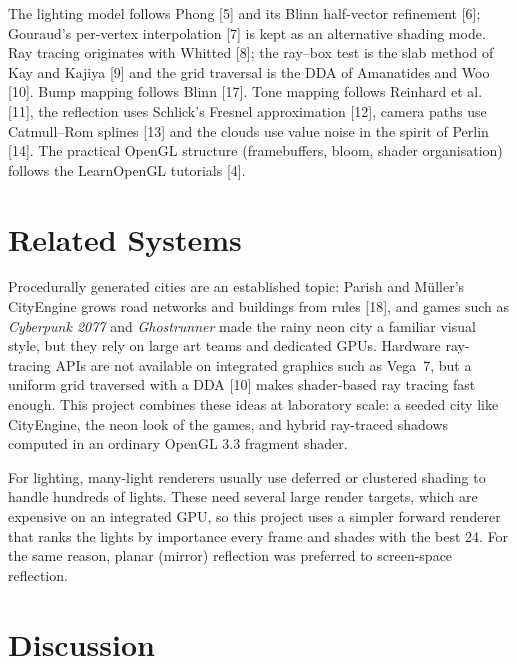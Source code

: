 \documentclass[12pt, a4paper]{report}
\begin{document}
\begin{justify}
  {\fontsize{12}{13.8}\selectfont
    The lighting model follows Phong [5] and its Blinn half-vector refinement [6]; Gouraud's per-vertex interpolation [7] is kept as an alternative shading mode. Ray tracing originates with Whitted [8]; the ray--box test is the slab method of Kay and Kajiya [9] and the grid traversal is the DDA of Amanatides and Woo [10]. Bump mapping follows Blinn [17]. Tone mapping follows Reinhard et al. [11], the reflection uses Schlick's Fresnel approximation [12], camera paths use Catmull--Rom splines [13] and the clouds use value noise in the spirit of Perlin [14]. The practical OpenGL structure (framebuffers, bloom, shader organisation) follows the LearnOpenGL tutorials [4].
  }
\end{justify}

\section{Related Systems}

\begin{justify}
  {\fontsize{12}{13.8}\selectfont
    Procedurally generated cities are an established topic: Parish and M\"uller's CityEngine grows road networks and buildings from rules [18], and games such as \textit{Cyberpunk 2077} and \textit{Ghostrunner} made the rainy neon city a familiar visual style, but they rely on large art teams and dedicated GPUs. Hardware ray-tracing APIs are not available on integrated graphics such as Vega~7, but a uniform grid traversed with a DDA [10] makes shader-based ray tracing fast enough. This project combines these ideas at laboratory scale: a seeded city like CityEngine, the neon look of the games, and hybrid ray-traced shadows computed in an ordinary OpenGL 3.3 fragment shader.
  }
\end{justify}

\begin{justify}
  {\fontsize{12}{13.8}\selectfont
    For lighting, many-light renderers usually use deferred or clustered shading to handle hundreds of lights. These need several large render targets, which are expensive on an integrated GPU, so this project uses a simpler forward renderer that ranks the lights by importance every frame and shades with the best 24. For the same reason, planar (mirror) reflection was preferred to screen-space reflection.
  }
\end{justify}

\section{Discussion}
\end{document}
